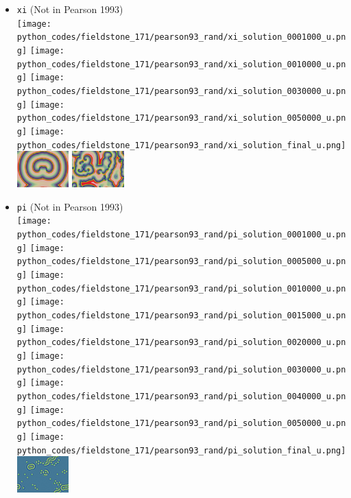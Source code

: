 \begin{itemize}
\item {\tt xi} (Not in Pearson 1993)\\
\texttt{[image: python\_codes/fieldstone\_171/pearson93\_rand/xi\_solution\_0001000\_u.png]}
\texttt{[image: python\_codes/fieldstone\_171/pearson93\_rand/xi\_solution\_0010000\_u.png]}
\texttt{[image: python\_codes/fieldstone\_171/pearson93\_rand/xi\_solution\_0030000\_u.png]}
\texttt{[image: python\_codes/fieldstone\_171/pearson93\_rand/xi\_solution\_0050000\_u.png]}
\texttt{[image: python\_codes/fieldstone\_171/pearson93\_rand/xi\_solution\_final\_u.png]}\\
\includegraphics[height=1.4cm]{python_codes/fieldstone_171/images/munafo_xi1}
\includegraphics[height=1.4cm]{python_codes/fieldstone_171/images/munafo_xi2}

\item {\tt pi} (Not in Pearson 1993)\\
\texttt{[image: python\_codes/fieldstone\_171/pearson93\_rand/pi\_solution\_0001000\_u.png]}
\texttt{[image: python\_codes/fieldstone\_171/pearson93\_rand/pi\_solution\_0005000\_u.png]}
\texttt{[image: python\_codes/fieldstone\_171/pearson93\_rand/pi\_solution\_0010000\_u.png]}
\texttt{[image: python\_codes/fieldstone\_171/pearson93\_rand/pi\_solution\_0015000\_u.png]}
\texttt{[image: python\_codes/fieldstone\_171/pearson93\_rand/pi\_solution\_0020000\_u.png]}
\texttt{[image: python\_codes/fieldstone\_171/pearson93\_rand/pi\_solution\_0030000\_u.png]}
\texttt{[image: python\_codes/fieldstone\_171/pearson93\_rand/pi\_solution\_0040000\_u.png]}
\texttt{[image: python\_codes/fieldstone\_171/pearson93\_rand/pi\_solution\_0050000\_u.png]}
\texttt{[image: python\_codes/fieldstone\_171/pearson93\_rand/pi\_solution\_final\_u.png]}\\
\includegraphics[height=1.4cm]{python_codes/fieldstone_171/images/munafo_pi}


\end{itemize}

